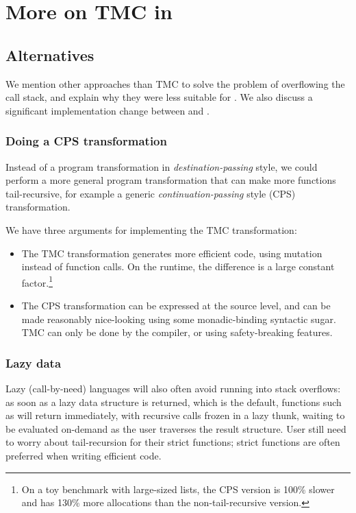 \section{More on TMC in \OCaml}
\label{app:more-ocaml}

\subsection{Alternatives}
\label{subsec:alternative-impls}

We mention other approaches than TMC to solve the problem of overflowing the call stack, and explain why they were less suitable for \OCaml. We also discuss a significant implementation change between  and .

\subsubsection{Doing a CPS transformation}

Instead of a program transformation in \emph{destination-passing} style, we could perform a more general program transformation that can make more functions tail-recursive, for example a generic \emph{continuation-passing} style (CPS) transformation.

We have three arguments for implementing the TMC transformation:
\begin{itemize}
\item The TMC transformation generates more efficient code, using mutation instead of function calls. On the \OCaml runtime, the difference is a large constant factor.\footnote{On a toy benchmark with large-sized lists, the CPS version is 100\% slower and has 130\% more allocations than the non-tail-recursive version.}

\item The CPS transformation can be expressed at the source level, and can be made reasonably nice-looking using some monadic-binding syntactic sugar. TMC can only be done by the compiler, or using safety-breaking features.
\end{itemize}

\subsubsection{Lazy data}

Lazy (call-by-need) languages will also often avoid running into stack overflows: as soon as a lazy data structure is returned, which is the default, functions such as  will return immediately, with recursive calls frozen in a lazy thunk, waiting to be evaluated on-demand as the user traverses the result structure.
User still need to worry about tail-recursion for their strict functions; strict functions are often preferred when writing efficient code.

